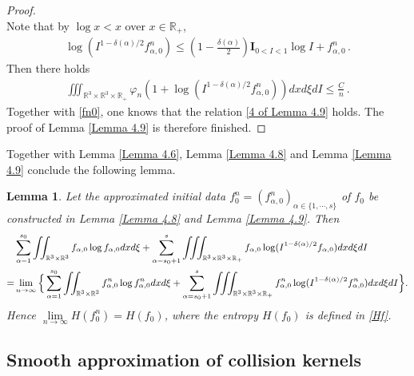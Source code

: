 \documentclass[reqno,11pt]{amsart}
\newtheorem{lemma}{Lemma}[section]
\numberwithin{equation}{section}
\def\R{\mathbb{R}}
\begin{document}
\begin{proof}
\begin{equation*}
\end{equation*}
Note that by $\log x < x$ over $x \in \R_+$,
\begin{equation*}
  \begin{aligned}
    \log ( I^{1-\delta(\alpha)/2} {f}^n_{\alpha,0} ) \leq (1 - \tfrac{\delta (\alpha)}{2}) \mathbf{I}_{0 < I < 1} \log I + {f}^n_{\alpha,0} \,.
  \end{aligned}
\end{equation*}
Then there holds
\begin{equation*}
  \begin{aligned}
    \iiint_{\R^3 \times \R^3\times \R_+} \varphi_n ( 1 + \log ( I^{1-\delta(\alpha)/2} {f}^n_{\alpha,0} ) ) d x d \xi d I \leq \tfrac{C}{n} \,.
  \end{aligned}
\end{equation*}
Together with \eqref{fn0}, one knows that the relation \eqref{4 of Lemma 4.9} holds. The proof of Lemma \ref{Lemma 4.9} is therefore finished.
\end{proof}

Together with Lemma \ref{Lemma 4.6}, Lemma \ref{Lemma 4.8} and Lemma \ref{Lemma 4.9} conclude the following lemma.

\begin{lemma}\label{Lmm-Ini-Entpy}
  Let the approximated initial data $f^n_0 = (f^n_{\alpha, 0})_{\alpha \in \{ 1, \cdots , s\}}$ of $f_0$ be constructed in Lemma \ref{Lemma 4.8} and Lemma \ref{Lemma 4.9}. Then
  \begin{equation}{\small
    \begin{aligned}
		& \sum_{\alpha = 1}^{s_0} \iint_{\R^3 \times \R^3} f_{\alpha, 0} \log f_{\alpha, 0} dxd\xi + \sum_{\alpha = s_0 + 1}^{s} \iiint_{\R^3 \times \R^3\times \R_+ } f_{\alpha, 0} \log (I^{1-\delta(\alpha )/2 } f_{\alpha, 0}) dxd\xi dI \\
= & \lim \limits_{n\rightarrow \infty } \Big\{ \sum_{\alpha = 1}^{s_0} \iint_{\R^3 \times \R^3 } f^n_{\alpha, 0} \log f^n_{\alpha, 0} dxd\xi + \sum_{\alpha = s_0 + 1}^{s} \iiint_{\R^3 \times \R^3\times \R_+ } f^n_{\alpha, 0} \log (I^{1-\delta(\alpha)/2}f^n_{\alpha, 0}) dxd\xi dI \Big\} .
\end{aligned}}
	\end{equation} 
Hence $\lim \limits_{n \to \infty} H (f^n_0) = H (f_0)$, where the entropy $H (f_0)$ is defined in \eqref{Hf}.
\end{lemma}


\subsection{Smooth approximation of collision kernels}
\end{document}
